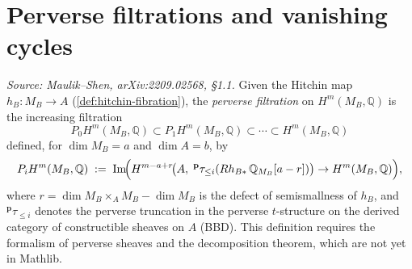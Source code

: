 \section{Perverse filtrations and vanishing cycles}

\begin{definition}[PerverseFiltration]
  \label{def:perverse-filtration}
  \textit{Source: Maulik--Shen, arXiv:2209.02568, §1.1.}
  Given the Hitchin map $h_B \colon M_B \to A$ (\cref{def:hitchin-fibration}), the
  \emph{perverse filtration} on $H^m(M_B, \mathbb{Q})$ is the increasing filtration
  \[
    P_0 H^m(M_B, \mathbb{Q}) \subset P_1 H^m(M_B, \mathbb{Q})
    \subset \cdots \subset H^m(M_B, \mathbb{Q})
  \]
  defined, for $\dim M_B = a$ and $\dim A = b$, by
  \[
    P_i H^m(M_B, \mathbb{Q}) \;:=\;
    \mathrm{Im}\!\Bigl(
      H^{m-a+r}\!\bigl(A,\; {{}^{\mathbf{p}}\tau_{\leq i}}
      (R h_{B*}\, \mathbb{Q}_{M_B}[a-r])\bigr)
      \to H^m(M_B, \mathbb{Q})
    \Bigr),
  \]
  where $r = \dim M_B \times_A M_B - \dim M_B$ is the defect of semismallness of $h_B$, and
  ${}^{\mathbf{p}}\tau_{\leq i}$ denotes the perverse truncation in the perverse $t$-structure
  on the derived category of constructible sheaves on $A$ (BBD).  This definition requires
  the formalism of perverse sheaves and the decomposition theorem, which are not yet in
  Mathlib.
\end{definition}

